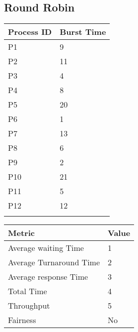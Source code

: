 \documentclass{article}
\begin{document}
\subsection{Round Robin}
\vspace{\baselineskip}
\hspace{1cm}
\begin{minipage}[t]{0.3\textwidth}
    \begin{tabularx}{\textwidth}{|l|X|}
    \hline
    \rowcolor{darkblue}
    \textbf{Process ID} & \textbf{Burst Time}\\
    \hline
    \rowcolor{lightblue}
    P1 & 9 \\
    P2 & 11 \\
    \rowcolor{lightblue}
    P3 & 4 \\
    P4 & 8 \\
    \rowcolor{lightblue}
    P5 & 20 \\
    P6 & 1 \\
    \rowcolor{lightblue}
    P7 & 13 \\
    P8 & 6 \\
    \rowcolor{lightblue}
    P9 & 2 \\
    P10 & 21 \\
    \rowcolor{lightblue}
    P11 & 5 \\
    P12 & 12 \\
    \rowcolor{lightblue}
    \hline
    \end{tabularx}
\end{minipage}
\hspace{2cm}
\begin{minipage}[t!]{0.35\textwidth}
    \begin{tabularx}{\textwidth}{|l|X|}
    \hline
    \rowcolor{darkblue}
    \textbf{Metric} & \textbf{Value} \\
    \hline
    \rowcolor{lightblue}
    Average waiting Time & 1 \\
    Average Turnaround Time & 2 \\
    \rowcolor{lightblue}
    Average response Time & 3 \\
    Total Time & 4 \\
    \rowcolor{lightblue}
    Throughput & 5 \\
    Fairness & No \\
    \hline
    \end{tabularx}
\end{minipage}

\bigskip
\end{document}
